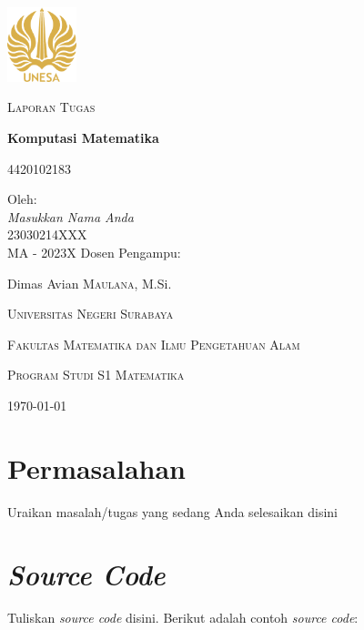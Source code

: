 \documentclass[english,12pt,a4paper,final]{article}
\begin{document}
	\begin{titlepage}
		\centering
		\includegraphics[width=0.15\textwidth]{logounesa.png}\par\vspace{1cm}
		{\Large \textsc{Laporan Tugas}\par}
		{\LARGE\bfseries Komputasi Matematika\par}
		{\large \textsc{4420102183}\par}
		\vspace{7cm}
		Oleh:\\[2ex]
		{\large\itshape Masukkan Nama Anda}\\
		23030214XXX\\
		MA - 2023X
		\vfill
		Dosen Pengampu:\par
		Dimas Avian \textsc{Maulana}, M.Si.\\
	
		\vfill
		{\large\textsc{Universitas Negeri Surabaya} \par}
		{\large\textsc{Fakultas Matematika dan Ilmu Pengetahuan Alam} \par}
		{\large\textsc{Program Studi S1 Matematika} \par}
		\vspace{1cm}
		{\large \today\par}
	\end{titlepage}
\section{Permasalahan}
Uraikan masalah/tugas yang sedang Anda selesaikan disini
\section{\textit{Source Code}}
Tuliskan \textit{source code} disini. Berikut adalah contoh \textit{source code}:
\end{document}
